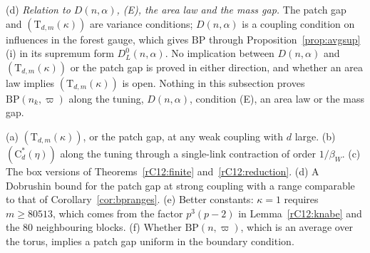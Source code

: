 \begin{remark}
(d) \emph{Relation to $D(n,\alpha)$, (E), the area law and the mass gap.}
The patch gap and $(\mathrm T_{d,m}(\kappa))$ are variance conditions;
$D(n,\alpha)$ is a coupling condition on influences in the forest gauge,
which gives $\mathrm{BP}$ through Proposition~\ref{prop:avgsup}(i) in its
supremum form $D^0_L(n,\alpha)$. No implication between $D(n,\alpha)$ and
$(\mathrm T_{d,m}(\kappa))$ or the patch gap is proved in either direction,
and whether an area law implies $(\mathrm T_{d,m}(\kappa))$ is open.
Nothing in this subsection proves $\mathrm{BP}(n_k,\varpi)$ along the
tuning, $D(n,\alpha)$, condition (E), an area law or the mass gap.
\end{remark}

\begin{remark}\label{rC12:open}
(a) $(\mathrm T_{d,m}(\kappa))$, or the patch gap, at any weak coupling
with $d$ large. (b) $(\mathrm C^*_d(\eta))$ along the tuning through a
single-link contraction of order $1/\beta_W$. (c) The box versions of
Theorems~\ref{rC12:finite} and~\ref{rC12:reduction}. (d) A Dobrushin
bound for the patch gap at strong coupling with a range comparable to that
of Corollary~\ref{cor:bpranges}. (e) Better constants: $\kappa=1$ requires
$m\ge80513$, which comes from the factor $p^3(p-2)$ in
Lemma~\ref{rC12:knabe} and the $80$ neighbouring blocks. (f) Whether
$\mathrm{BP}(n,\varpi)$, which is an average over the torus, implies a
patch gap uniform in the boundary condition.
\end{remark}
